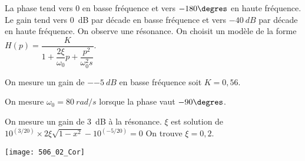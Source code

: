 \ifprof
La phase tend vers 0 en basse fréquence et vers $-180\degres$ en haute fréquence. Le gain tend vers \SI{0}{dB} par décade en basse fréquence et vers $\SI{-40}{dB}$ par décade en haute fréquence.  On observe une résonance. 
On choisit un modèle de la forme $H(p)=\dfrac{K}{1+\dfrac{2\xi}{\omega_0}p+\dfrac{p^2}{\omega_0^2s}}$.

On mesure un gain de $-\SI{-5}{dB}$ en basse fréquence soit $K = 0,56$. 

On mesure $\omega_0 = \SI{80}{rad/s}$ lorsque la phase vaut $-90\degres$.

On mesure un gain de \SI{3}{dB} à la résonance. 
$\xi$ est solution de $10^{(3/20)}\times 2\xi\sqrt{1-x^2}-10^{(-5/20)} = 0$
On trouve $\xi = 0,2$.


\begin{center}
\texttt{[image: 506\_02\_Cor]}
\end{center}

\else
\fi





\ifprof
\else
{}
\fi